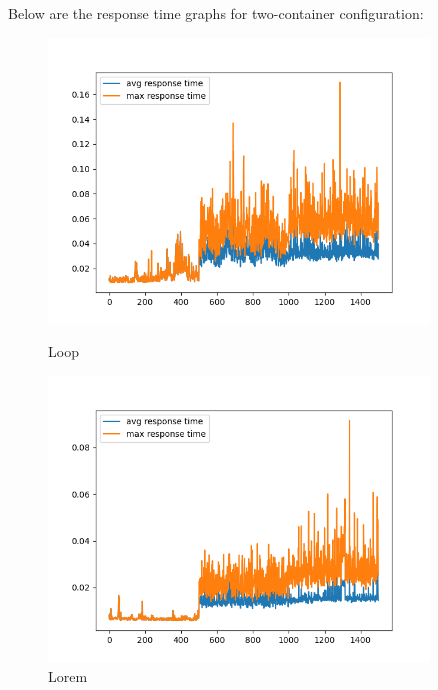 \noindent Below are the response time graphs for two-container configuration:

\begin{figure}[h]
    \begin{minipage}[t]{0.5\textwidth}
        \centering
        \includegraphics[width=0.9\textwidth]{../sample_results/loop/two-container/response-time-two-container-two-container.png}
        \caption{Loop}
    \end{minipage}
    \hfill
    \begin{minipage}[t]{0.5\textwidth}
        \centering
        \includegraphics[width=0.9\textwidth]{../sample_results/lorem/two-container/response-time-two-container-two-container.png}
        \caption{Lorem}
    \end{minipage}
\end{figure}

\newpage
